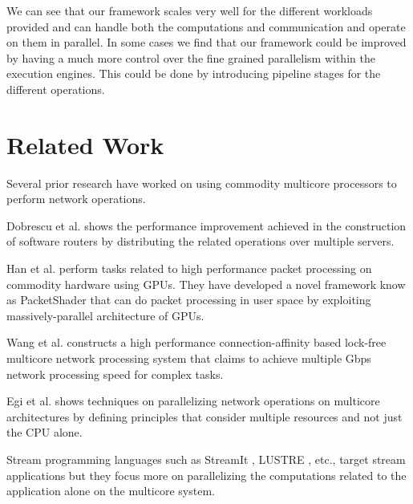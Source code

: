 \documentclass[conference]{IEEEtran}
\newcommand{\comment}[1]{}
\begin{document}
We can see that our framework scales very well for the different workloads provided and can handle both the computations and communication and operate on them in parallel. In some cases we find that our framework could be improved by having a much more control over the fine grained parallelism within the execution engines. This could be done by introducing pipeline stages for the different operations.

\section{Related Work}

Several prior research \cite{Dobrescu09routebricks:exploiting}\cite{Han:2010:PGS:1851275.1851207}\cite{Wang:2009:PPN:1542275.1542307}\cite{springerlink:10.1007/s11227-011-0579-3} have worked on using commodity multicore processors to perform network operations. 

Dobrescu et al.\cite{Dobrescu09routebricks:exploiting} shows the performance improvement achieved in the construction of software routers by distributing the related operations over multiple servers. 

Han et al. \cite{Han:2010:PGS:1851275.1851207} perform tasks related to high performance packet processing on commodity hardware using GPUs. They have developed a novel framework know as PacketShader that can do packet processing in user space by exploiting massively-parallel architecture of GPUs. 

Wang et al. \cite{Wang:2009:PPN:1542275.1542307} constructs a high performance connection-affinity based lock-free multicore network processing system that claims to achieve multiple Gbps network processing speed for complex tasks. 

Egi et al.\cite{springerlink:10.1007/s11227-011-0579-3} shows techniques on parallelizing network operations on multicore architectures by defining principles that consider multiple resources and not just the CPU alone.

Stream programming languages such as StreamIt \cite{Thies:2002:SLS:647478.727935}, LUSTRE \cite{Halbwachs91thesynchronous}, etc., target stream applications but they focus more on parallelizing the computations related to the application alone on the multicore system.

\comment{
All of these applications are more focused on operating as a network application and primarily focus on parallelizing packet operations. In our work even though a part of it involves parallelizing network operations, the objective of this research is to provide support for parallelizing stream application and distributing their workloads over multiple systems. This also requires optimizing the underlying network operations by parallelizing it.}
\end{document}
